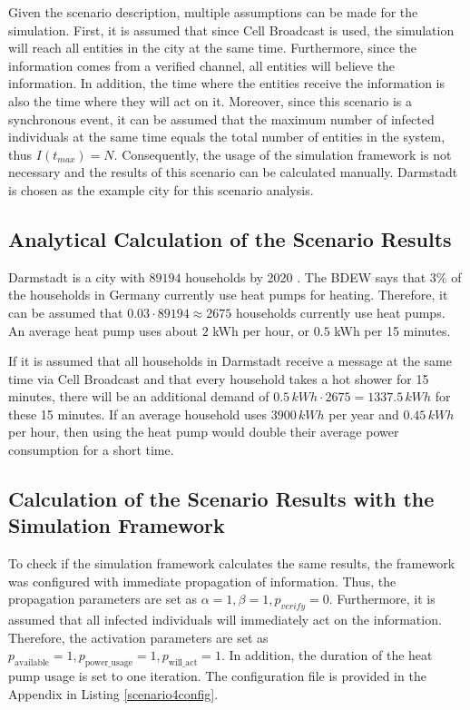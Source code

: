 Given the scenario description, multiple assumptions can be
made for the simulation.
First, it is assumed that since Cell Broadcast is used, the simulation
will reach all entities in the city at the same time.
Furthermore, since the information comes from a verified channel,
all entities will believe the information. In addition, the time where the
entities receive the information is also the time where they will act
on it.
Moreover, since this scenario is a synchronous event, it can be 
assumed that the
maximum number of infected individuals at the same time equals
the total number of entities in the system, thus $I(t_{max})=N$.
Consequently, the usage of the simulation framework is not necessary
and the results of this scenario can be calculated manually.
Darmstadt is chosen as the example city for this scenario analysis.

\subsection{Analytical Calculation of the Scenario Results}

Darmstadt is a city with $89194$ households by 2020 
\cite{statistadarmstadt}. The BDEW
says that $3\%$ of the households in Germany currently use
heat pumps for heating. Therefore, it can be assumed that 
$0.03 \cdot 89194 \approx 2675$ households currently use 
heat pumps. An average heat pump uses about $2$ kWh per hour, 
or $0.5$ kWh per 15 minutes.

If it is assumed that all households in Darmstadt receive 
a message at the same time via Cell Broadcast and that
every household takes a hot shower for 15 minutes,
there will be an additional 
demand of $0.5\,kWh \cdot 2675 = 1337.5\,kWh $ for these 
15 minutes. If an average household uses $3900\,kWh$ 
per year and $0.45\,kWh$ per hour, then using the heat pump 
would double their average power consumption for a short time.

\subsection{Calculation of the Scenario Results with the Simulation Framework}
To check if the simulation framework calculates the same 
results, the framework was configured with immediate
propagation of information. Thus, the propagation
parameters are set as 
$\alpha=1, \beta=1, p_{verify}=0$. 
Furthermore, it is assumed that all infected 
individuals will immediately act on the information.
Therefore, the activation parameters are 
set as $p_{\mathrm{available}}=1, 
p_{\mathrm{power\_usage}}=1, p_{\mathrm{will\_act}}=1$.
In addition, the duration of the heat pump usage is set to one iteration.
The configuration file is provided in the Appendix in
Listing \ref{scenario4config}.

